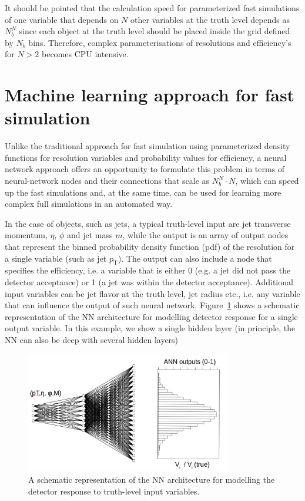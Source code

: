 \documentclass[showpacs,showkeys,preprint,prd,nofootinbib,linenumbers,12pt]{revtex4-1}
\def\pt{\ensuremath{p_{\mathrm{T}}}}
\begin{document}
It should be pointed that the calculation speed for parameterized fast simulations of one variable that depends on $N$ other variables at the truth level depends  as $N_b^N$ since each object at the truth level should be placed inside the grid defined by $N_b$ bins. Therefore, complex parameterisations of resolutions and efficiency's for $N>2$ becomes CPU intensive. 

\section{Machine learning approach for fast simulation}

Unlike the traditional approach for fast simulation using parameterized density functions for resolution variables and probability values for efficiency, a neural network approach offers an opportunity to formulate this problem in terms of neural-network nodes and their connections that scale as $N_b^N \cdot N$, which can speed up the fast simulations and, at the same time, can be used for learning more complex full simulations in an automated way.

In the case of objects, such as jets, a typical truth-level input are jet transverse momentum, $\eta$, $\phi$ and jet mass $m$, while the output
is an array of output nodes that represent the binned probability density function (pdf) of the resolution for a single variable (such as jet \pt). 
The output can also include a node that specifies the efficiency, i.e. a variable that is either 0 (e.g. a jet did not pass the detector acceptance) or 1 (a jet was within the detector acceptance). Additional input variables can be jet flavor at the truth level, jet radius etc., i.e. any variable that 
can influence the output of such neural network. Figure~\ref{ann_example} shows a schematic representation of the NN architecture for modelling detector response for a single output variable. In this example, we show a single hidden layer (in principle, the NN can also be deep with several hidden layers)

\begin{figure}[h]
  \includegraphics[width=0.8\textwidth]{nn_example.png}
  \caption{A schematic representation of the NN architecture for modelling the detector response to truth-level input variables.}
  \label{ann_example}
\end{figure}
\end{document}
